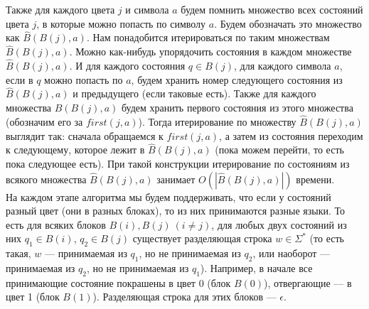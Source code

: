 \documentclass{article}
\begin{document}
Также для каждого цвета $j$ и символа $a$ будем помнить множество всех состояний цвета $j$, в которые можно попасть по символу $a$. Будем обозначать это множество как $\hat B(B(j), a)$. Нам понадобится итерироваться по таким множествам $\hat B(B(j), a)$. Можно как-нибудь упорядочить состояния в каждом множестве $\hat B(B(j), a)$. И для каждого состояния $q \in B(j)$, для каждого символа $a$, если в $q$ можно попасть по $a$, будем хранить номер следующего состояния из $\hat B(B(j), a)$ и предыдущего (если таковые есть). Также для каждого множества $\hat B(B(j), a)$ будем хранить первого состояния из этого множества (обозначим его за $first(j, a)$). Тогда итерирование по множеству $\hat B(B(j), a)$ выглядит так: сначала обращаемся к $first(j, a)$, а затем из состояния переходим к следующему, которое лежит в $\hat B(B(j), a)$ (пока можем перейти, то есть пока следующее есть). При такой конструкции итерирование по состояниям из всякого множества $\hat B(B(j), a)$ занимает $O(|\hat B(B(j), a)|)$ времени.\\
На каждом этапе алгоритма мы будем поддерживать, что если у состояний разный цвет (они в разных блоках), то из них принимаются разные языки. То есть для всяких блоков $B(i), B(j) \ (i \neq j)$, для любых двух состояний из них $q_1 \in B(i)$, $q_2 \in B(j)$ существует разделяющая строка $w \in \Sigma^*$ (то есть такая, $w$  --- принимаемая из $q_1$, но не принимаемая из $q_2$, или наоборот --- принимаемая из $q_2$, но не принимаемая из $q_1$). Например, в начале все принимающие состояние покрашены в цвет 0 (блок $B(0)$), отвергающие --- в цвет 1 (блок $B(1)$). Разделяющая строка для этих блоков --- $\epsilon$. \\
\end{document}

